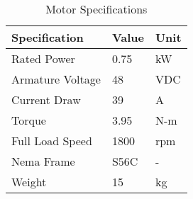   \begin{table}[htbp]
 \centering
 \caption{Motor Specifications}
 \begin{tabular}{| lll |} \hline
 Specification & Value & Unit \\ \hline
Rated Power & 0.75 & kW \\
Armature Voltage & 48 & VDC \\
Current Draw & 39 & A \\
Torque & 3.95 & N-m \\
Full Load Speed & 1800 & rpm \\
Nema Frame & S56C & - \\
Weight & 15 & kg \\ \hline
 \end{tabular}
 \label{tab:motor_spec}
 \end{table}
 
 